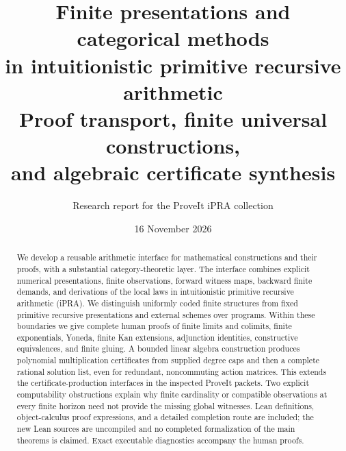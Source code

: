 \documentclass[11pt,a4paper]{article}
\title{Finite presentations and categorical methods\\in intuitionistic primitive recursive arithmetic\\[5pt]\large Proof transport, finite universal constructions,\\and algebraic certificate synthesis}
\author{Research report for the ProveIt iPRA collection}
\date{16 November 2026}
\theoremstyle{definition}
\theoremstyle{remark}
\begin{document}
\maketitle
\begin{abstract}
We develop a reusable arithmetic interface for mathematical constructions and
their proofs, with a substantial category-theoretic layer. The interface combines
explicit numerical presentations, finite observations, forward witness maps,
backward finite demands, and derivations of the local laws in intuitionistic
primitive recursive arithmetic (iPRA). We distinguish uniformly coded finite
structures from fixed primitive recursive presentations and external schemes
over programs. Within these boundaries we give complete human proofs of finite
limits and colimits, finite exponentials, Yoneda, finite Kan extensions,
adjunction identities, constructive equivalences, and finite gluing. A bounded
linear algebra construction produces polynomial multiplication certificates
from supplied degree caps and then a complete rational solution list, even for
redundant, noncommuting action matrices. This extends the certificate-production
interfaces in the inspected ProveIt packets. Two explicit computability
obstructions explain why finite cardinality or compatible observations at every
finite horizon need not provide the missing global witnesses. Lean definitions,
object-calculus proof expressions, and a detailed completion route are included;
the new Lean sources are uncompiled and no completed formalization of the main
theorems is claimed. Exact executable diagnostics accompany the human proofs.
\end{abstract}
\clearpage
{\fontsize{10}{11}\selectfont\setlength{\parskip}{0pt}\tableofcontents}
\newpage










\end{document}
